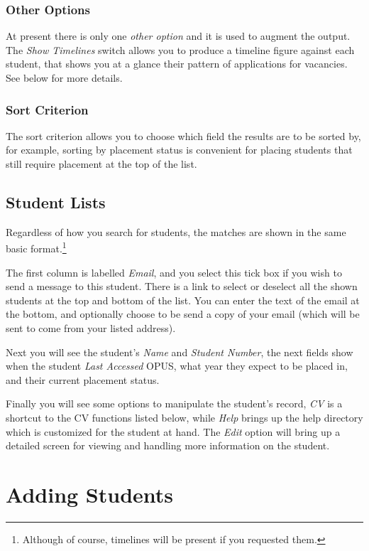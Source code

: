 \documentclass[12 pt]{book}
\begin{document}
\subsubsection{Other Options}

At present there is only one \emph{other option} and it is used to augment the
output. The \emph{Show Timelines} switch allows you to produce a timeline
figure against each student, that shows you at a glance their pattern of
applications for vacancies. See below for more details.

\subsubsection{Sort Criterion}

The sort criterion allows you to choose which field the results are to be sorted
by, for example, sorting by placement status is convenient for placing students
that still require placement at the top of the list.

\subsection{Student Lists}

Regardless of how you search for students, the matches are shown in the same
basic format.\footnote{Although of course, timelines will be present if you
requested them.}%

The first column is labelled \emph{Email}, and you select this tick box if you
wish to send a message to this student. There is a link to select or deselect
all the shown students at the top and bottom of the list. You can enter the
text of the email at the bottom, and optionally choose to be send a copy of
your email (which will be sent to come from your listed address).

Next you will see the student's \emph{Name} and \emph{Student Number}, the next
fields show when the student \emph{Last Accessed} OPUS, what year they expect
to be placed in, and their current placement status.

Finally you will see some options to manipulate the student's record, \emph{CV} is a
shortcut to the CV functions listed below, while \emph{Help} brings up the
help directory which is customized for the student at hand. The \emph{Edit}
option will bring up a detailed screen for viewing and handling more 
information on the student.

\section{Adding Students}
\end{document}
